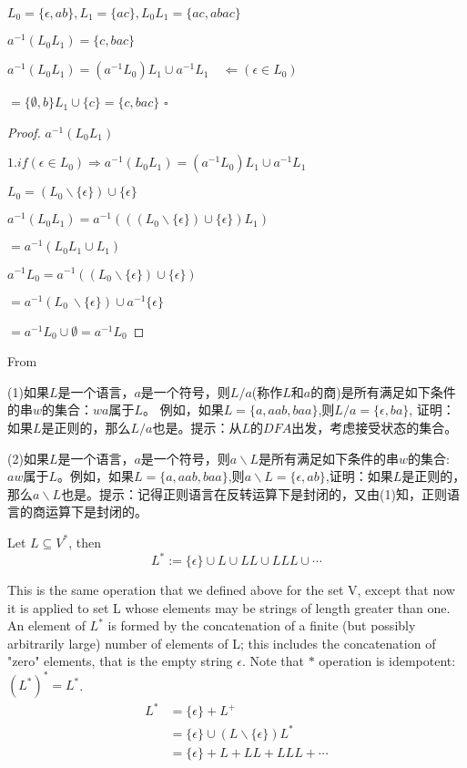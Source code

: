 \begin{example}
	$L_0 = \{\epsilon,ab\},L_1 = \{ac\}, L_0L_1 = \{ac,abac\}$
	
	$a^{-1}(L_0L_1) = \{c,bac\}$
	
	$a^{-1}(L_0L_1) = (a^{-1}L_0)L_1 \cup a^{-1}L_1 \quad\Leftarrow(\epsilon \in L_0)$
	
	$= \{\emptyset,b\}L_1 \cup \{c\} = \{c,bac\}$ \hfill$\square$ 
\end{example}

\begin{proof}
	$a^{-1}(L_0L_1)$
	
	$1. if(\epsilon \in L_0) \Rightarrow a^{-1}(L_0L_1) = (a^{-1}L_0)L_1 \cup a^{-1}L_1 $ 
	
	$L_0 = (L_0 \backslash \{\epsilon\}) \cup \{\epsilon\}$
	
	$a^{-1}(L_0L_1) = a^{-1}(((L_0 \backslash \{\epsilon\}) \cup \{\epsilon\})L_1)$
	
	$=a^{-1}(L_0L_1\cup L_1)$
	
	$a^{-1}L_0 = a^{-1}((L_0 \backslash \{\epsilon\}) \cup \{\epsilon\})$
	
	$=a^{-1}(L_0\ \backslash \{\epsilon \}) \cup a^{-1}\{\epsilon \}$
	
	$=a^{-1}L_0 \cup \emptyset = a^{-1}L_0$
\end{proof}
	

\clearpage

From \cite[p99]{Hopcroft2008}

(1)如果$L$是一个语言，$a$是一个符号，则$L/a$(称作$L$和$a$的商)是所有满足如下条件的串$w$的集合：$wa$属于$L$。
例如，如果$L=\{a,aab,baa\}$,则$L/a = \{\epsilon,ba\}$, 证明：如果$L$是正则的，那么$L/a$也是。提示：从$L$的$DFA$出发，考虑接受状态的集合。

(2)如果$L$是一个语言，$a$是一个符号，则$a\backslash L$是所有满足如下条件的串$w$的集合: $aw$属于$L$。例如，如果$L=\{a,aab,baa\}$,则$a\backslash L=\{\epsilon,ab\}$,证明：如果$L$是正则的，那么$a\backslash L$也是。提示：记得正则语言在反转运算下是封闭的，又由(1)知，正则语言的商运算下是封闭的。

\begin{definition}
	Let $L\subseteq V^{\ast}$, then 
	$$L^{\ast} := \{\epsilon\}\cup L \cup LL\cup LLL\cup \cdots$$ 
\end{definition}

This is the same operation that we defined above for the set V, except that now it is applied to set L whose elements may be strings of length greater than one. An element of $L^*$ is formed by the concatenation of a finite (but possibly arbitrarily large) number of elements of L; this includes the concatenation of "zero" elements, that is the empty string $\epsilon$. Note that $\ast$ operation is idempotent: ${(L^*)}^* = L^*$.
\begin{align*}
L^{\ast} &= \{\epsilon\} +L^{+} \\
&=  \{\epsilon\}\cup (L\backslash \{\epsilon\})L^{\ast}\\ &=\{\epsilon\} + L + LL + LLL + \cdots 
\end{align*}

